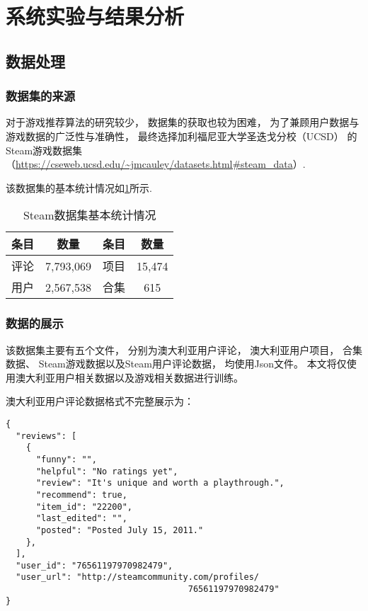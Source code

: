 \section{系统实验与结果分析}

\subsection{数据处理}

\subsubsection{数据集的来源}

对于游戏推荐算法的研究较少，
数据集的获取也较为困难，
为了兼顾用户数据与游戏数据的广泛性与准确性，
最终选择加利福尼亚大学圣迭戈分校（UCSD）
的Steam游戏数据集
（\url{https://cseweb.ucsd.edu/~jmcauley/datasets.html#steam_data}）.

该数据集的基本统计情况如\cref{tb:dataset}所示.

\begin{table}[!htbp]
	\begin{center}
		\caption{Steam数据集基本统计情况}\label{tb:dataset}
		\begin{tabular}{cccc}
			\toprule
			条目 & 数量        & 条目 & 数量     \\
			\midrule
			评论 & 7,793,069 & 项目 & 15,474 \\
			用户 & 2,567,538 & 合集 & 615    \\
			\bottomrule
		\end{tabular}
	\end{center}
\end{table}

\subsubsection{数据的展示}

该数据集主要有五个文件，
分别为澳大利亚用户评论，
澳大利亚用户项目，
合集数据、
Steam游戏数据以及Steam用户评论数据，
均使用Json文件。
本文将仅使用澳大利亚用户相关数据以及游戏相关数据进行训练。

澳大利亚用户评论数据格式不完整展示为：
\begin{verbatim}
{
  "reviews": [
    {
      "funny": "",
      "helpful": "No ratings yet",
      "review": "It's unique and worth a playthrough.",
      "recommend": true,
      "item_id": "22200",
      "last_edited": "",
      "posted": "Posted July 15, 2011."
    },
  ],
  "user_id": "76561197970982479",
  "user_url": "http://steamcommunity.com/profiles/
                                    76561197970982479"
}
\end{verbatim}

